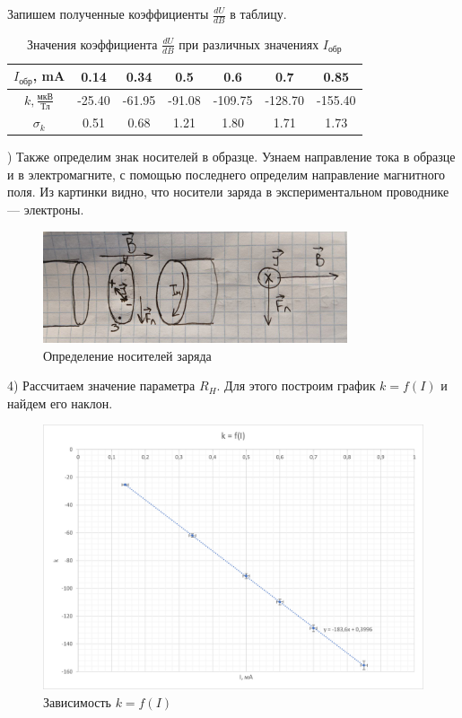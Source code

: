\documentclass[a4paper, 14pt]{article}
\begin{document}
	Запишем полученные коэффициенты $\frac{dU}{dB}$ в таблицу.
	
	\begin{table}[h]
		\centering
		\begin{tabular}{|c|c|c|c|c|c|c|}
			\hline
			$I_{\text{обр}}$, mA & 0.14 & 0.34 & 0.5 & 0.6 & 0.7 & 0.85 \\ \hline
			$k, \frac{\text{мкВ}}{\text{Тл}}$ & -25.40 & -61.95 & -91.08 & -109.75 & -128.70 & -155.40 \\ \hline
			$\sigma_k$ & 0.51 & 0.68 & 1.21 & 1.80 & 1.71 & 1.73 \\ \hline 
		\end{tabular}
		\caption{Значения коэффициента $\frac{dU}{dB}$ при различных значениях $I_{\text{обр}}$}
	\end{table}
	) Также определим знак носителей в образце. Узнаем направление тока в образце и в электромагните, с помощью последнего определим направление магнитного поля. Из картинки видно, что носители заряда в экспериментальном проводнике --- электроны.
	
	\begin{figure}
		\centering
		\includegraphics[width=0.8\textwidth]{2}
		\caption{Определение носителей заряда}
	\end{figure}
		
	
	4) Рассчитаем значение параметра $R_H$. Для этого построим график $k = f(I)$ и найдем его наклон.
	
	\begin{figure}[h!]
		\centering
		\includegraphics[width=\textwidth]{Gr3}
		\caption{Зависимость $k = f(I)$}
	\end{figure}
	
\end{document}
